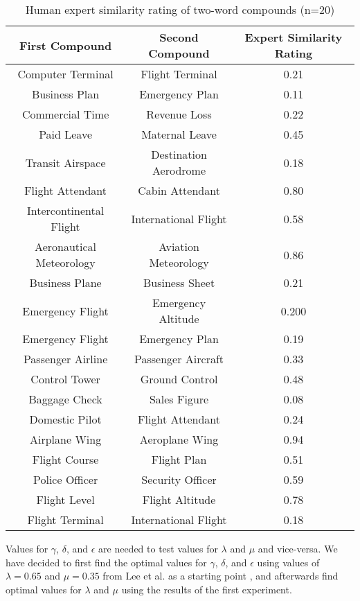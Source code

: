 \documentclass{article}
\begin{document}
\begin{table}[h!]
\caption{Human expert similarity rating of two-word compounds (n=20)}
\centering
\begin{tabular}{|c|c||c|}
	\hline
	First Compound & Second Compound & Expert Similarity Rating \\
	\hline
	Computer Terminal & Flight Terminal & 0.21 \\
	Business Plan & Emergency Plan & 0.11 \\
	Commercial Time & Revenue Loss & 0.22 \\
	Paid Leave & Maternal Leave & 0.45 \\
	Transit Airspace & Destination Aerodrome & 0.18 \\
	Flight Attendant & Cabin Attendant & 0.80 \\
	Intercontinental Flight & International Flight & 0.58 \\
	Aeronautical Meteorology & Aviation Meteorology & 0.86 \\
	Business Plane & Business Sheet & 0.21 \\
	Emergency Flight & Emergency Altitude & 0.200 \\
	Emergency Flight & Emergency Plan & 0.19 \\
	Passenger Airline & Passenger Aircraft & 0.33 \\
	Control Tower & Ground Control & 0.48 \\
	Baggage Check & Sales Figure & 0.08 \\
	Domestic Pilot & Flight Attendant & 0.24 \\
	Airplane Wing & Aeroplane Wing & 0.94 \\
	Flight Course & Flight Plan & 0.51 \\
	Police Officer & Security Officer & 0.59 \\
	Flight Level & Flight Altitude & 0.78 \\
	Flight Terminal & International Flight & 0.18 \\
	\hline
\end{tabular}
\label{table:humancompoundsimilarity}
\end{table}

Values for $\gamma$, $\delta$, and $\epsilon$ are needed to test values for $\lambda$ and $\mu$ and vice-versa. We have decided to first find the optimal values for $\gamma$, $\delta$, and $\epsilon$ using values of $\lambda = 0.65$ and $\mu = 0.35$ from Lee et al. as a starting point \cite{lee2016combining}, and afterwards find optimal values for $\lambda$ and $\mu$ using the results of the first experiment.
\end{document}
